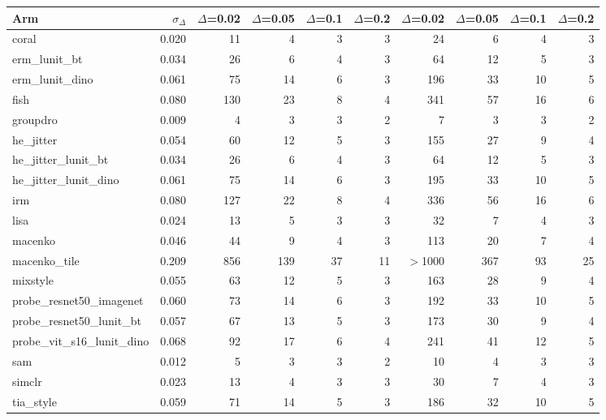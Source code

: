 \begin{tabular}{lrrrrrrrrr}
\toprule
Arm & $\sigma_\Delta$ & $\Delta$=0.02 & $\Delta$=0.05 & $\Delta$=0.1 & $\Delta$=0.2 & $\Delta$=0.02 & $\Delta$=0.05 & $\Delta$=0.1 & $\Delta$=0.2 \\
\midrule
coral & 0.020 & 11 & 4 & 3 & 3 & 24 & 6 & 4 & 3 \\
erm\_lunit\_bt & 0.034 & 26 & 6 & 4 & 3 & 64 & 12 & 5 & 3 \\
erm\_lunit\_dino & 0.061 & 75 & 14 & 6 & 3 & 196 & 33 & 10 & 5 \\
fish & 0.080 & 130 & 23 & 8 & 4 & 341 & 57 & 16 & 6 \\
groupdro & 0.009 & 4 & 3 & 3 & 2 & 7 & 3 & 3 & 2 \\
he\_jitter & 0.054 & 60 & 12 & 5 & 3 & 155 & 27 & 9 & 4 \\
he\_jitter\_lunit\_bt & 0.034 & 26 & 6 & 4 & 3 & 64 & 12 & 5 & 3 \\
he\_jitter\_lunit\_dino & 0.061 & 75 & 14 & 6 & 3 & 195 & 33 & 10 & 5 \\
irm & 0.080 & 127 & 22 & 8 & 4 & 336 & 56 & 16 & 6 \\
lisa & 0.024 & 13 & 5 & 3 & 3 & 32 & 7 & 4 & 3 \\
macenko & 0.046 & 44 & 9 & 4 & 3 & 113 & 20 & 7 & 4 \\
macenko\_tile & 0.209 & 856 & 139 & 37 & 11 & $>$1000 & 367 & 93 & 25 \\
mixstyle & 0.055 & 63 & 12 & 5 & 3 & 163 & 28 & 9 & 4 \\
probe\_resnet50\_imagenet & 0.060 & 73 & 14 & 6 & 3 & 192 & 33 & 10 & 5 \\
probe\_resnet50\_lunit\_bt & 0.057 & 67 & 13 & 5 & 3 & 173 & 30 & 9 & 4 \\
probe\_vit\_s16\_lunit\_dino & 0.068 & 92 & 17 & 6 & 4 & 241 & 41 & 12 & 5 \\
sam & 0.012 & 5 & 3 & 3 & 2 & 10 & 4 & 3 & 3 \\
simclr & 0.023 & 13 & 4 & 3 & 3 & 30 & 7 & 4 & 3 \\
tia\_style & 0.059 & 71 & 14 & 5 & 3 & 186 & 32 & 10 & 5 \\
\bottomrule
\end{tabular}
